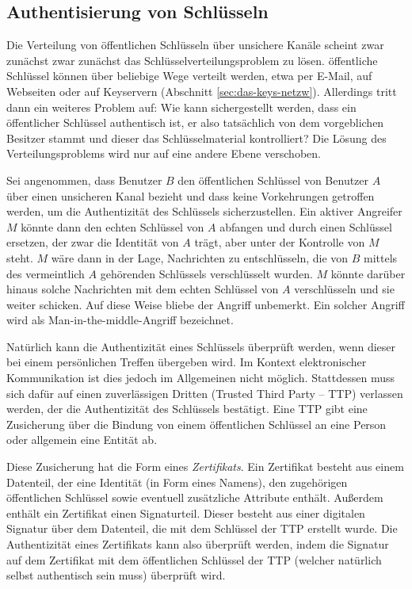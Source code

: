 \subsection{Authentisierung von Schlüsseln}
\label{ch:Grundlagen:sec:PublicKeyCrypto:subsec:KeyAuth}
Die Verteilung von öffentlichen Schlüsseln über unsichere
Kanäle scheint zwar zunächst zwar zunächst das
Schlüsselverteilungsproblem zu lösen. öffentliche Schlüssel
können über beliebige Wege verteilt werden, etwa per E-Mail, auf
Webseiten oder auf Keyservern (Abschnitt
\ref{sec:das-keys-netzw}). Allerdings tritt dann ein weiteres Problem
auf: Wie kann sichergestellt werden, dass ein öffentlicher
Schlüssel authentisch ist, er also tatsächlich von dem
vorgeblichen Besitzer stammt und dieser das Schlüsselmaterial
kontrolliert? Die Lösung des Verteilungsproblems wird nur auf eine
andere Ebene verschoben.

Sei angenommen, dass Benutzer $B$ den öffentlichen Schlüssel von
Benutzer $A$ über einen unsicheren Kanal bezieht und dass keine
Vorkehrungen getroffen werden, um die Authentizität des Schlüssels
sicherzustellen. Ein aktiver Angreifer $M$ könnte dann den echten
Schlüssel von $A$ abfangen und durch einen Schlüssel ersetzen, der
zwar die Identität von $A$ trägt, aber unter der Kontrolle von $M$
steht. $M$ wäre dann in der Lage, Nachrichten zu entschlüsseln,
die von $B$ mittels des vermeintlich $A$ gehörenden Schlüssels
verschlüsselt wurden. $M$ könnte darüber hinaus solche
Nachrichten mit dem echten Schlüssel von $A$ verschlüsseln und sie
weiter schicken. Auf diese Weise bliebe der Angriff unbemerkt. Ein
solcher Angriff wird als Man-in-the-middle-Angriff bezeichnet.

Natürlich kann die Authentizität eines Schlüssels überprüft
werden, wenn dieser bei einem persönlichen Treffen übergeben
wird. Im Kontext elektronischer Kommunikation ist dies jedoch im
Allgemeinen nicht möglich. Stattdessen muss sich dafür auf einen
zuverlässigen Dritten (Trusted Third Party -- TTP) verlassen werden,
der die Authentizität des Schlüssels bestätigt. Eine TTP gibt
eine Zusicherung über die Bindung von einem öffentlichen
Schlüssel an eine Person oder allgemein eine Entität ab.

Diese Zusicherung hat die Form eines \emph{Zertifikats}. Ein
Zertifikat besteht aus einem Datenteil, der eine Identität (in Form
eines Namens), den zugehörigen öffentlichen Schlüssel sowie
eventuell zusätzliche Attribute enthält. Außerdem enthält ein
Zertifikat einen Signaturteil. Dieser besteht aus einer digitalen
Signatur über dem Datenteil, die mit dem Schlüssel der TTP
erstellt wurde. Die Authentizität eines Zertifikats kann also
überprüft werden, indem die Signatur auf dem Zertifikat mit dem
öffentlichen Schlüssel der TTP (welcher natürlich selbst
authentisch sein muss) überprüft wird.

